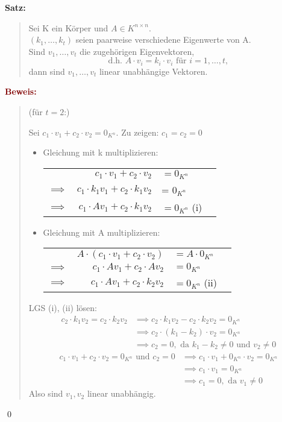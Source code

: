 \documentclass{article}
\newcommand{\dgr}[1]{\textcolor{dgr}{#1}}
\newcommand{\maroon}[1]{\textcolor{maroon}{#1}}
\newcommand{\se}[1]{\dgr{\textbf{Satz: }}\begin{quote}#1\end{quote}}
\newcommand{\pr}[1]{\maroon{\textbf{Beweis: }}\begin{quote}#1\end{quote}\qed}
\begin{document}
\se{
    Sei K ein Körper und $A \in K^{n \times n}$.\\
    $(k_1, \dots, k_t)$ seien paarweise verschiedene Eigenwerte von A.\\
    Sind $v_1, \dots, v_t$ die zugehörigen Eigenvektoren,
    \[
        \text{d.h. } A \cdot v_i = k_i \cdot v_i \text{ für } i = 1, \dots, t,
    \]
    dann sind $v_1, \dots, v_t$ linear unabhängige Vektoren.
}

\pr{
    (für $t = 2$:)

    Sei $c_1 \cdot v_1 + c_2 \cdot v_2 = 0_{K^n}$. Zu zeigen: $c_1 = c_2 = 0$
    \begin{itemize}
        \item Gleichung mit k multiplizieren:
        
        \begin{tabular}{rrll}
            &$c_1 \cdot v_1 + c_2 \cdot v_2$ &$= 0_{K^n}$\\
            $\implies$& $c_1 \cdot k_1v_1 + c_2 \cdot k_1v_2$ &= $0_{K^n}$\\
            $\implies$& $c_1 \cdot Av_1 + c_2 \cdot k_1v_2$ &$= 0_{K^n}$ (i)
        \end{tabular}
        \item Gleichung mit A multiplizieren:
        
        \begin{tabular}{rrll}
            &$A \cdot (c_1 \cdot v_1 + c_2 \cdot v_2)$ &$= A \cdot 0_{K^n}$\\
            $\implies$& $c_1 \cdot Av_1 + c_2 \cdot Av_2$ &$= 0_{K^n}$\\
            $\implies$& $c_1 \cdot Av_1 + c_2 \cdot k_2v_2$ &$= 0_{K^n}$ (ii)
        \end{tabular}
    \end{itemize}
    LGS (i), (ii) lösen:
    \begin{align*}
        c_2 \cdot k_1v_2 = c_2 \cdot k_2v_2 &\implies c_2 \cdot k_1v_2 - c_2 \cdot k_2v_2 = 0_{K^n}\\
        &\implies c_2 \cdot (k_1 - k_2) \cdot v_2 = 0_{K^n}\\
        &\implies c_2 = 0, \text{ da $k_1 - k_2 \ne 0$ und $v_2 \ne 0$}
    \end{align*}
    \begin{align*}
        c_1 \cdot v_1 +c_2 \cdot v_2 = 0_{K^n} \text{ und } c_2 = 0 &\implies c_1 \cdot v_1 + 0_{K^n} \cdot v_2 = 0_{K^n}\\
        &\implies c_1 \cdot v_1 = 0_{K^n}\\
        &\implies c_1 = 0, \text{ da $v_1 \ne 0$}
    \end{align*}
    Also sind $v_1, v_2$ linear unabhängig.
}
\end{document}
